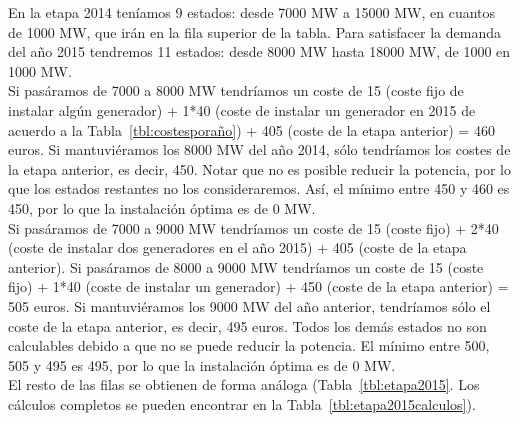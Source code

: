 \documentclass[12pt,a4paper,twoside,openright,titlepage,final]{article}
\begin{document}
En la etapa 2014 teníamos 9 estados: desde 7000 MW a 15000 MW, en cuantos de 1000 MW, que irán en la fila superior de la tabla. Para satisfacer la demanda del año 2015 tendremos 11 estados: desde 8000 MW hasta 18000 MW, de 1000 en 1000 MW.\\

Si pasáramos de 7000 a 8000 MW tendríamos un coste de 15 (coste fijo de instalar algún generador) + 1*40 (coste de instalar un generador en 2015 de acuerdo a la Tabla~\ref{tbl:costesporaño}) + 405 (coste de la etapa anterior) = 460 euros. Si mantuviéramos los 8000 MW del año 2014, sólo tendríamos los costes de la etapa anterior, es decir, 450. Notar que no es posible reducir la potencia, por lo que los estados restantes no los consideraremos. Así, el mínimo entre 450 y 460 es 450, por lo que la instalación óptima es de 0 MW.\\

Si pasáramos de 7000 a 9000 MW tendríamos un coste de 15 (coste fijo) + 2*40 (coste de instalar dos generadores en el año 2015) + 405 (coste de la etapa anterior). Si pasáramos de 8000 a 9000 MW tendríamos un coste de 15 (coste fijo) + 1*40 (coste de instalar un generador) + 450 (coste de la etapa anterior) = 505 euros. Si mantuviéramos los 9000 MW del año anterior, tendríamos sólo el coste de la etapa anterior, es decir, 495 euros. Todos los demás estados no son calculables debido a que no se puede reducir la potencia. El mínimo entre 500, 505 y 495 es 495, por lo que la instalación óptima es de 0 MW.\\

El resto de las filas se obtienen de forma análoga (Tabla~\ref{tbl:etapa2015}. Los cálculos completos se pueden encontrar en la Tabla~\ref{tbl:etapa2015calculos}).\\
\end{document}
